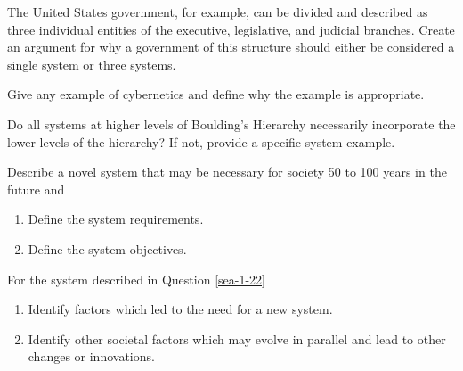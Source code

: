 \begin{exercises}
    \begin{exercise} 
    \label{sea-1-17}
        The United States government, for example, can be divided and described as three individual entities of the executive, legislative, and judicial branches. Create an argument for why a government of this structure should either be considered a single system or three systems.
    \end{exercise}
    \begin{solution}
    \end{solution}
    
    \begin{exercise} 
    \label{sea-1-19}
        Give any example of cybernetics and define why the example is appropriate.
    \end{exercise}
    \begin{solution}
    \end{solution}
    
    \begin{exercise} 
    \label{sea-1-21}
        Do all systems at higher levels of Boulding's Hierarchy necessarily incorporate the lower levels of the hierarchy? If not, provide a specific system example.
    \end{exercise}
    \begin{solution}
    \end{solution}
    
    \begin{exercise} 
    \label{sea-1-22}
        Describe a novel system that may be necessary for society 50 to 100 years in the future and
        \begin{enumerate}[label=\alph*)]
            \item Define the system requirements.
            \item Define the system objectives.
        \end{enumerate}
    \end{exercise}
    \begin{solution}
    \end{solution}
    
    \begin{exercise} 
    \label{sea-1-25}
        For the system described in Question \ref{sea-1-22}
        \begin{enumerate}[label=\alph*)]
            \item Identify factors which led to the need for a new system.
            \item Identify other societal factors which may evolve in parallel and lead to other changes or innovations.
        \end{enumerate}
    \end{exercise}
    \begin{solution}
    \end{solution}
    

\end{exercises}
